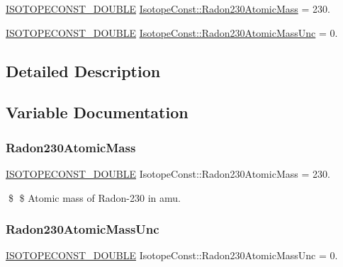 \begin{DoxyCompactItemize}
\item 
\mbox{\hyperlink{group___isotope_const-_macros_ga8f45a7272ce02c0b4c65c44636ed719a}{I\+S\+O\+T\+O\+P\+E\+C\+O\+N\+S\+T\+\_\+\+D\+O\+U\+B\+LE}} \mbox{\hyperlink{group___isotope_const-_radon-_rn230_gaf48ee378d8109582c37442b4a6a5cf32}{Isotope\+Const\+::\+Radon230\+Atomic\+Mass}} = 230.
\item 
\mbox{\hyperlink{group___isotope_const-_macros_ga8f45a7272ce02c0b4c65c44636ed719a}{I\+S\+O\+T\+O\+P\+E\+C\+O\+N\+S\+T\+\_\+\+D\+O\+U\+B\+LE}} \mbox{\hyperlink{group___isotope_const-_radon-_rn230_gab64659bec6a306423a42a63a993a7b51}{Isotope\+Const\+::\+Radon230\+Atomic\+Mass\+Unc}} = 0.
\end{DoxyCompactItemize}


\subsection{Detailed Description}


\subsection{Variable Documentation}
\mbox{\label{group___isotope_const-_radon-_rn230_gaf48ee378d8109582c37442b4a6a5cf32}} 
\subsubsection{\texorpdfstring{Radon230\+Atomic\+Mass}{Radon230AtomicMass}}
{\footnotesize\ttfamily \mbox{\hyperlink{group___isotope_const-_macros_ga8f45a7272ce02c0b4c65c44636ed719a}{I\+S\+O\+T\+O\+P\+E\+C\+O\+N\+S\+T\+\_\+\+D\+O\+U\+B\+LE}} Isotope\+Const\+::\+Radon230\+Atomic\+Mass = 230.}

\$ \$ Atomic mass of Radon-\/230 in amu. \mbox{\label{group___isotope_const-_radon-_rn230_gab64659bec6a306423a42a63a993a7b51}} 
\subsubsection{\texorpdfstring{Radon230\+Atomic\+Mass\+Unc}{Radon230AtomicMassUnc}}
{\footnotesize\ttfamily \mbox{\hyperlink{group___isotope_const-_macros_ga8f45a7272ce02c0b4c65c44636ed719a}{I\+S\+O\+T\+O\+P\+E\+C\+O\+N\+S\+T\+\_\+\+D\+O\+U\+B\+LE}} Isotope\+Const\+::\+Radon230\+Atomic\+Mass\+Unc = 0.}

